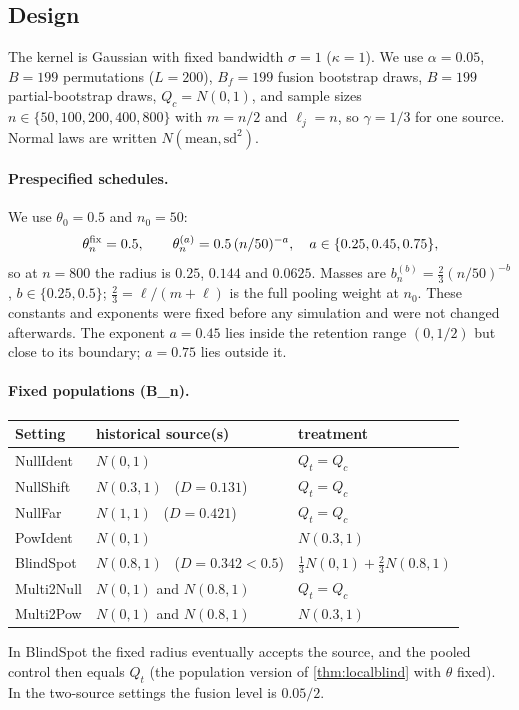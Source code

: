 \subsection{Design}\label{sec:design}

The kernel is Gaussian with fixed bandwidth $\sigma=1$ ($\kappa=1$). We use $\alpha=0.05$, $B=199$ permutations ($L=200$), $B_f=199$ fusion bootstrap draws, $B=199$ partial-bootstrap draws, $Q_c=N(0,1)$, and sample sizes $n\in\{50,100,200,400,800\}$ with $m=n/2$ and $\ell_j=n$, so $\gamma=1/3$ for one source. Normal laws are written $N(\text{mean},\text{sd}^2)$.

\paragraph{Prespecified schedules.} We use $\theta_0=0.5$ and $n_0=50$:
\[
\theta_n^{\rm fix}=0.5,\qquad \theta_n^{(a)}=0.5\,(n/50)^{-a},\quad a\in\{0.25,0.45,0.75\},
\]
so at $n=800$ the radius is $0.25$, $0.144$ and $0.0625$. Masses are $b_n^{(b)}=\tfrac23(n/50)^{-b}$, $b\in\{0.25,0.5\}$; $\tfrac23=\ell/(m+\ell)$ is the full pooling weight at $n_0$. These constants and exponents were fixed before any simulation and were not changed afterwards. The exponent $a=0.45$ lies inside the retention range $(0,1/2)$ but close to its boundary; $a=0.75$ lies outside it.

\paragraph{Fixed populations (B\_n).}
\begin{center}\small
\begin{tabular}{@{}lll@{}}
\toprule
Setting & historical source(s) & treatment\\
\midrule
NullIdent & $N(0,1)$ & $Q_t=Q_c$\\
NullShift & $N(0.3,1)$ \ ($D=0.131$) & $Q_t=Q_c$\\
NullFar & $N(1,1)$ \ ($D=0.421$) & $Q_t=Q_c$\\
PowIdent & $N(0,1)$ & $N(0.3,1)$\\
BlindSpot & $N(0.8,1)$ \ ($D=0.342<0.5$) & $\tfrac13N(0,1)+\tfrac23N(0.8,1)$\\
Multi2Null & $N(0,1)$ and $N(0.8,1)$ & $Q_t=Q_c$\\
Multi2Pow & $N(0,1)$ and $N(0.8,1)$ & $N(0.3,1)$\\
\bottomrule
\end{tabular}
\end{center}
In BlindSpot the fixed radius eventually accepts the source, and the pooled control then equals $Q_t$ (the population version of \cref{thm:localblind} with $\theta$ fixed). In the two-source settings the fusion level is $0.05/2$.

